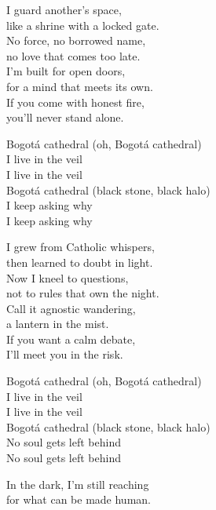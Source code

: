 \begin{lyrics}
I guard another’s space,\\
like a shrine with a locked gate.\\
No force, no borrowed name,\\
no love that comes too late.\\
I’m built for open doors,\\
for a mind that meets its own.\\
If you come with honest fire,\\
you’ll never stand alone.

Bogotá cathedral
(oh, Bogotá cathedral)\\
I live in the veil\\
I live in the veil\\
Bogotá cathedral
(black stone, black halo)\\
I keep asking why\\
I keep asking why

I grew from Catholic whispers,\\
then learned to doubt in light.\\
Now I kneel to questions,\\
not to rules that own the night.\\
Call it agnostic wandering,\\
a lantern in the mist.\\
If you want a calm debate,\\
I’ll meet you in the risk.

Bogotá cathedral
(oh, Bogotá cathedral)\\
I live in the veil\\
I live in the veil\\
Bogotá cathedral
(black stone, black halo)\\
No soul gets left behind\\
No soul gets left behind

In the dark, I’m still reaching\\
for what can be made human.
\end{lyrics}

